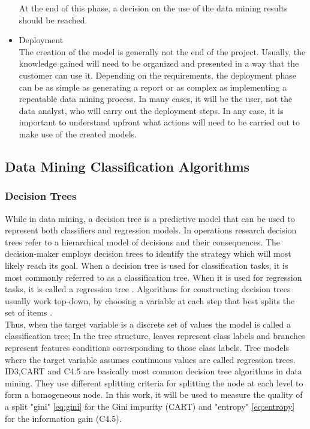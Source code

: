 \begin{itemize}
At the end of this phase, a decision on the use of the data mining results should be reached.
\item Deployment\\
The creation of the model is generally not the end of the project. Usually, the knowledge gained
will need to be organized and presented in a way that the customer can use it. Depending on
the requirements, the deployment phase can be as simple as generating a report or as complex
as implementing a repeatable data mining process. In many cases, it will be the user, not the
data analyst, who will carry out the deployment steps. In any case, it is important to
understand upfront what actions will need to be carried out to make use of
the created models.
\end{itemize}


\subsection{Data Mining Classification Algorithms}

\subsubsection{Decision Trees}
\label{subsub:decision_trees}
While in data mining, a decision tree is a predictive model that can be used to represent both classifiers and regression models. In operations research decision trees refer to a hierarchical model of decisions and their consequences\cite{Rokach2014}. The decision-maker employs decision trees to identify the strategy which will most likely reach its goal. When a decision tree is used for classification tasks, it is most commonly referred to as a classification tree. When it is used for regression tasks, it is called a regression tree \cite{Rokach2014}.
Algorithms for constructing decision trees usually work top-down, by choosing a variable at each step that best splits the set of items \cite{ApplicationsReviews}.\\
Thus, when the target variable is a discrete set of values the model is called a classification tree; In the tree structure, leaves represent class labels and branches represent features conditions corresponding to those class labels. Tree models where the target variable assumes continuous values are called regression trees.
ID3,CART and C4.5 are basically most common decision tree algorithms in data mining. They use different splitting criteria for splitting the node at each level to form a homogeneous node.
In this work, it will be used to measure the quality of a split "gini" \ref{eq:gini} for the Gini impurity (CART)\cite{DTAnalysis} and "entropy" \ref{eq:entropy} for the information gain (C4.5)\cite{DTAnalysis}.

